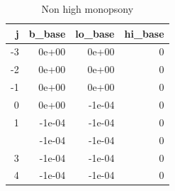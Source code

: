 \begin{table}

\caption{Non high monopsony}
\centering
\begin{tabular}[t]{rrrr}
\toprule
j & b\_base & lo\_base & hi\_base\\
\midrule
-3 & 0e+00 & 0e+00 & 0\\
-2 & 0e+00 & 0e+00 & 0\\
-1 & 0e+00 & 0e+00 & 0\\
0 & 0e+00 & -1e-04 & 0\\
1 & -1e-04 & -1e-04 & 0\\
\addlinespace
2 & -1e-04 & -1e-04 & 0\\
3 & -1e-04 & -1e-04 & 0\\
4 & -1e-04 & -1e-04 & 0\\
\bottomrule
\end{tabular}
\end{table}
